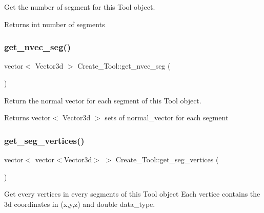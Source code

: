 Get the number of segment for this \textquotesingle{}Tool\textquotesingle{} object. 

\begin{DoxyReturn}{Returns}
int number of segments 
\end{DoxyReturn}
\mbox{\label{classCreate__Tool_ac997ba484168b43803bad484f2e4eaaa}} 
\subsubsection{\texorpdfstring{get\+\_\+nvec\+\_\+seg()}{get\_nvec\_seg()}}
{\footnotesize\ttfamily vector$<$ Vector3d $>$ Create\+\_\+\+Tool\+::get\+\_\+nvec\+\_\+seg (\begin{DoxyParamCaption}{ }\end{DoxyParamCaption})\hspace{0.3cm}{\ttfamily [inline]}}



Return the normal vector for each segment of this \textquotesingle{}Tool\textquotesingle{} object. 

\begin{DoxyReturn}{Returns}
vector$<$ Vector3d $>$ sets of normal\+\_\+vector for each segment 
\end{DoxyReturn}
\mbox{\label{classCreate__Tool_a6e11b0f95ff11d0bd67dade19e17377f}} 
\subsubsection{\texorpdfstring{get\+\_\+seg\+\_\+vertices()}{get\_seg\_vertices()}}
{\footnotesize\ttfamily vector$<$ vector$<$Vector3d$>$ $>$ Create\+\_\+\+Tool\+::get\+\_\+seg\+\_\+vertices (\begin{DoxyParamCaption}{ }\end{DoxyParamCaption})\hspace{0.3cm}{\ttfamily [inline]}}



Get every vertices in every segments of this \textquotesingle{}Tool\textquotesingle{} object Each vertice contains the 3d coordinates in (x,y,z) and double data\+\_\+type. 

